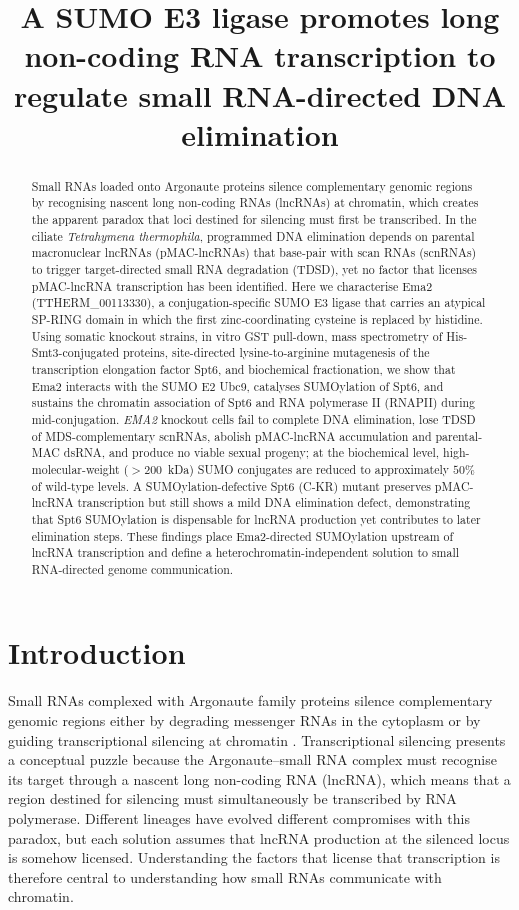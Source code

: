 \documentclass[11pt]{article}
\title{A SUMO E3 ligase promotes long non-coding RNA transcription to
regulate small RNA-directed DNA elimination}
\author{}
\date{}
\begin{document}
\maketitle

\begin{abstract}
Small RNAs loaded onto Argonaute proteins silence complementary genomic
regions by recognising nascent long non-coding RNAs (lncRNAs) at chromatin,
which creates the apparent paradox that loci destined for silencing must
first be transcribed. In the ciliate \emph{Tetrahymena thermophila},
programmed DNA elimination depends on parental macronuclear lncRNAs
(pMAC-lncRNAs) that base-pair with scan RNAs (scnRNAs) to trigger
target-directed small RNA degradation (TDSD), yet no factor that licenses
pMAC-lncRNA transcription has been identified. Here we characterise Ema2
(TTHERM\_00113330), a conjugation-specific SUMO E3 ligase that carries an
atypical SP-RING domain in which the first zinc-coordinating cysteine is
replaced by histidine. Using somatic knockout strains, in vitro GST
pull-down, mass spectrometry of His-Smt3-conjugated proteins, site-directed
lysine-to-arginine mutagenesis of the transcription elongation factor Spt6,
and biochemical fractionation, we show that Ema2 interacts with the SUMO E2
Ubc9, catalyses SUMOylation of Spt6, and sustains the chromatin association
of Spt6 and RNA polymerase II (RNAPII) during mid-conjugation.
\emph{EMA2} knockout cells fail to complete DNA elimination, lose TDSD of
MDS-complementary scnRNAs, abolish pMAC-lncRNA accumulation and parental-MAC
dsRNA, and produce no viable sexual progeny; at the biochemical level,
high-molecular-weight ($>\!200$~kDa) SUMO conjugates are reduced to
approximately $50\%$ of wild-type levels. A SUMOylation-defective Spt6
(C-KR) mutant preserves pMAC-lncRNA transcription but still shows a mild
DNA elimination defect, demonstrating that Spt6 SUMOylation is dispensable
for lncRNA production yet contributes to later elimination steps. These
findings place Ema2-directed SUMOylation upstream of lncRNA transcription
and define a heterochromatin-independent solution to small RNA-directed
genome communication.
\end{abstract}

\section{Introduction}

Small RNAs complexed with Argonaute family proteins silence complementary
genomic regions either by degrading messenger RNAs in the cytoplasm or by
guiding transcriptional silencing at chromatin
\citep{holoch2015rna,wilson2013rnai}. Transcriptional silencing presents a
conceptual puzzle because the Argonaute--small RNA complex must recognise
its target through a nascent long non-coding RNA (lncRNA), which means
that a region destined for silencing must simultaneously be transcribed
by RNA polymerase. Different lineages have evolved different compromises
with this paradox, but each solution assumes that lncRNA production at the
silenced locus is somehow licensed. Understanding the factors that license
that transcription is therefore central to understanding how small RNAs
communicate with chromatin.
\end{document}
